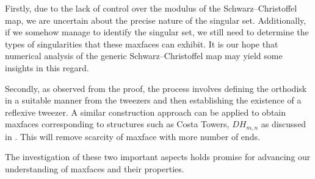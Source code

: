 \documentclass[12pt,epsfig,tikz,multi]{amsart}
\numberwithin{equation}{section}
\begin{document}
Firstly, due to the lack of control over the modulus of the Schwarz--Christoffel map, we are uncertain about the precise nature of the singular set. Additionally, if we somehow manage to identify the singular set, we still need to determine the types of singularities that these maxfaces can exhibit. It is our hope that numerical analysis of the generic Schwarz--Christoffel map may yield some insights in this regard.

Secondly, as observed from the proof, the process involves defining the orthodisk in a suitable manner from the tweezers and then establishing the existence of a reflexive tweezer. A similar construction approach can be applied to obtain maxfaces corresponding to structures such as Costa Towers, $DH_{m,n}$ as discussed in \cite{Weber1998TeichmullerTA}. This will remove scarcity of maxface with more number of ends.

The investigation of these two important aspects holds promise for advancing our understanding of maxfaces and their properties. 


 

\end{document}
